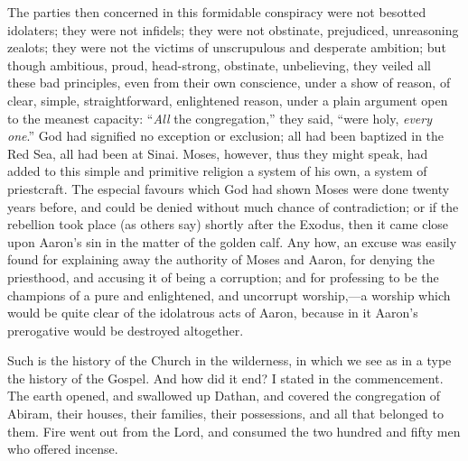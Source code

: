 The parties then concerned in this formidable conspiracy were not
besotted idolaters; they were not infidels; they were not obstinate,
prejudiced, unreasoning zealots; they were not the victims of
unscrupulous and desperate ambition; but though ambitious, proud,
head-strong, obstinate, unbelieving, they veiled all these bad
principles, even from their own conscience, under a show of reason, of
clear, simple, straightforward, enlightened reason, under a plain
argument open to the meanest capacity: ``\emph{All} the
congregation,'' they said, ``were holy, \emph{every one}.''
God had signified no exception or exclusion; all had been baptized in
the Red Sea, all had been at Sinai. Moses, however, thus they might
speak, had added to this simple and primitive religion a system of his
own, a system of priestcraft. The especial favours which God had shown
Moses were done twenty years before, and could be denied without much
chance of contradiction; or if the rebellion took place (as others
say) shortly after the Exodus, then it came close upon Aaron's sin in
the matter of the golden calf. Any how, an excuse was easily found for
explaining away the authority of Moses and Aaron, for denying the
priesthood, and accusing it of being a corruption; and for professing
to be the champions of a pure and enlightened, and uncorrupt worship,—a
worship which would be quite clear of the idolatrous acts of Aaron,
because in it Aaron's prerogative would be destroyed altogether.

Such is the history of the Church in the wilderness, in which we
see as in a type the history of the Gospel. And how did it end? I
stated in the commencement. The earth opened, and swallowed up Dathan,
and covered the congregation of Abiram, their houses, their families,
their possessions, and all that belonged to them. Fire went out from
the Lord, and consumed the two hundred and fifty men who offered
incense.

